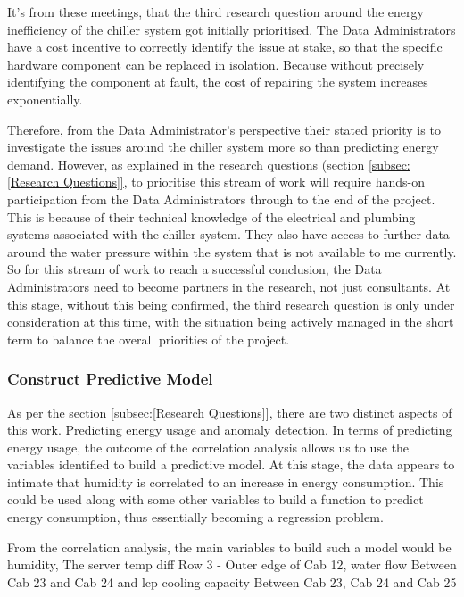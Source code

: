 \documentclass[12pt]{scrartcl}
\begin{document}
It's from these meetings, that the third research question around the energy inefficiency of the chiller system got initially prioritised. The Data Administrators have a cost incentive to correctly identify the issue at stake, so that the specific hardware component can be replaced in isolation. Because without precisely identifying the component at fault, the cost of repairing the system increases exponentially. 

Therefore, from the Data Administrator's perspective their stated priority is to investigate the issues around the chiller system more so than predicting energy demand. However, as explained in the research questions (section \ref{subsec:[Research Questions]}, to prioritise this stream of work will require hands-on participation from the Data Administrators through to the end of the project. This is because of their technical knowledge of the electrical and plumbing systems associated with the chiller system. They also have access to further data around the water pressure within the system that is not available to me currently. So for this stream of work to reach a successful conclusion, the Data Administrators need to become partners in the research, not just consultants. At this stage, without this being confirmed, the third research question is only under consideration at this time, with the situation being actively managed in the short term to balance the overall priorities of the project.  


\subsubsection{Construct Predictive Model}
\label{subsubsec:[Construct Predictive Model]}

As per the section \ref{subsec:[Research Questions]}, there are two distinct aspects of this work. Predicting energy usage and anomaly detection. In terms of predicting energy usage, the outcome of the correlation analysis allows us to use the variables identified to build a predictive model. At this stage, the data appears to intimate that humidity is correlated to an increase in energy consumption. This could be used along with some other variables to build a function to predict energy consumption, thus essentially becoming a regression problem. 

From the correlation analysis, the main variables to build such a model would be humidity, The server temp diff Row 3 - Outer edge of Cab 12, water flow Between Cab 23 and Cab 24 and lcp cooling capacity Between Cab 23, Cab 24 and Cab 25
\end{document}

